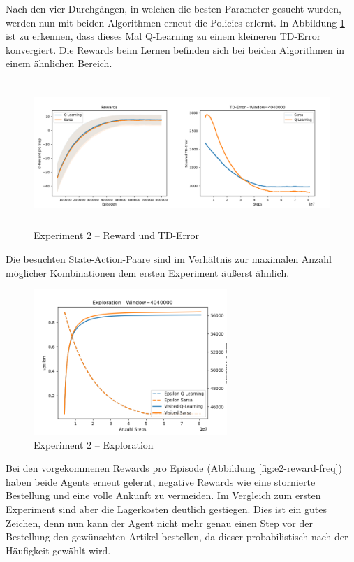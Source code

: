 Nach den vier Durchgängen, in welchen die besten Parameter gesucht wurden, werden nun mit beiden Algorithmen erneut die Policies erlernt. In Abbildung \ref{fig:e2-train} ist zu erkennen, dass dieses Mal Q-Learning zu einem kleineren TD-Error konvergiert. Die Rewards beim Lernen befinden sich bei beiden Algorithmen in einem ähnlichen Bereich. 
\begin{figure}[H]
  \centering
  \includegraphics[height=5.5cm]{img/plots/exp-2/rew&td.png}
  \caption{Experiment 2 – Reward und TD-Error}
    \label{fig:e2-train}
\end{figure} 
Die besuchten State-Action-Paare sind im Verhältnis zur maximalen Anzahl möglicher Kombinationen dem ersten Experiment äußerst ähnlich. 
\begin{figure}[H]
  \centering
  \includegraphics[height=5.5cm]{img/plots/exp-2/both_exploration.png}
  \caption{Experiment 2 – Exploration}
    \label{fig:e2-expl-both}
\end{figure}
\newpage
Bei den vorgekommenen Rewards pro Episode (Abbildung \ref{fig:e2-reward-freq}) haben beide Agents erneut gelernt, negative Rewards wie eine stornierte Bestellung und eine volle Ankunft zu vermeiden. Im Vergleich zum ersten Experiment sind aber die Lagerkosten deutlich gestiegen. Dies ist ein gutes Zeichen, denn nun kann der Agent nicht mehr genau einen Step vor der Bestellung den gewünschten Artikel bestellen, da dieser probabilistisch nach der Häufigkeit gewählt wird.
